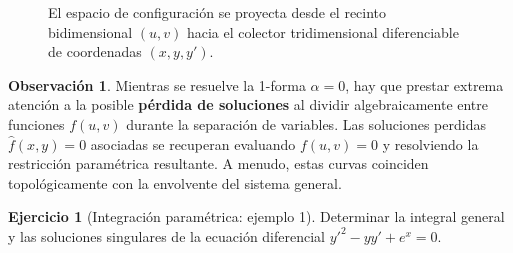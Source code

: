 \documentclass[11pt,a4paper]{article}
\theoremstyle{definition}
\newtheorem{exercise}{Ejercicio}[section]
\newtheorem{remark}{Observación}[section]
\theoremstyle{plain}
\begin{document}
\begin{figure}[H]
    \caption{El espacio de configuración se proyecta desde el recinto bidimensional $(u,v)$ hacia el colector tridimensional diferenciable de coordenadas $(x, y, y')$.}
\end{figure}

\begin{remark}
Mientras se resuelve la 1-forma $\alpha = 0$, hay que prestar extrema atención a la posible \textbf{pérdida de soluciones} al dividir algebraicamente entre funciones $f(u,v)$ durante la separación de variables. Las soluciones perdidas $\hat{f}(x,y) = 0$ asociadas se recuperan evaluando $f(u,v) = 0$ y resolviendo la restricción paramétrica resultante. A menudo, estas curvas coinciden topológicamente con la envolvente del sistema general.
\end{remark}

\begin{exercise}[Integración paramétrica: ejemplo 1]
Determinar la integral general y las soluciones singulares de la ecuación diferencial $y'^2 - yy' + e^x = 0$.
\end{exercise}
\end{document}
